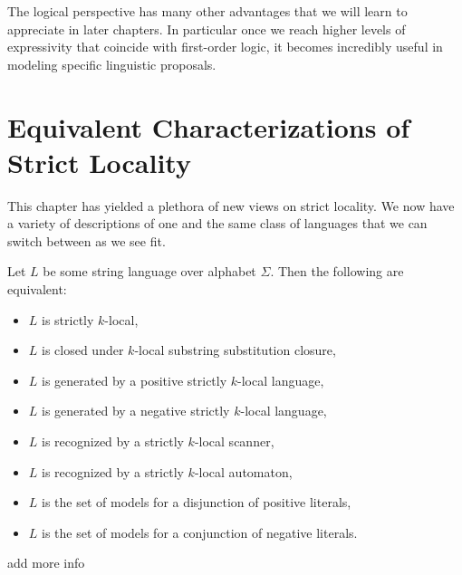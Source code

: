 The logical perspective has many other advantages that we will learn to appreciate in later chapters.
In particular once we reach higher levels of expressivity that coincide with first-order logic, it becomes incredibly useful in modeling specific linguistic proposals.


\section{Equivalent Characterizations of Strict Locality}

This chapter has yielded a plethora of new views on strict locality.
We now have a variety of descriptions of one and the same class of languages that we can switch between as we see fit.

\begin{theorem}
    Let $L$ be some string language over alphabet $\Sigma$.
    Then the following are equivalent:
    \begin{itemize}
        \item $L$ is strictly $k$-local,
        \item $L$ is closed under $k$-local substring substitution closure,
        \item $L$ is generated by a positive strictly $k$-local language,
        \item $L$ is generated by a negative strictly $k$-local language,
        \item $L$ is recognized by a strictly $k$-local scanner,
        \item $L$ is recognized by a strictly $k$-local automaton,
        \item $L$ is the set of models for a disjunction of positive literals,
        \item $L$ is the set of models for a conjunction of negative literals.
    \end{itemize}
\end{theorem}
%

\begin{literature}
add more info
\end{literature}
